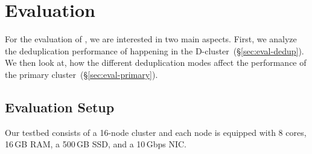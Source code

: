 \section{ Evaluation}
\label{sec:Evaluation}

For the evaluation of \sysname, we are interested in two main aspects. First, we analyze the deduplication
performance of \sysname happening in the D-cluster~(\S\ref{sec:eval-dedup}). 
We then look at, how
the different deduplication modes affect the performance of the primary cluster~(\S\ref{sec:eval-primary}).


\subsection{Evaluation Setup}

Our testbed consists of 
a 16-node cluster and
each node is equipped with 8 cores, 16\,GB RAM, a 500\,GB SSD, and a 10\,Gbps NIC. 


